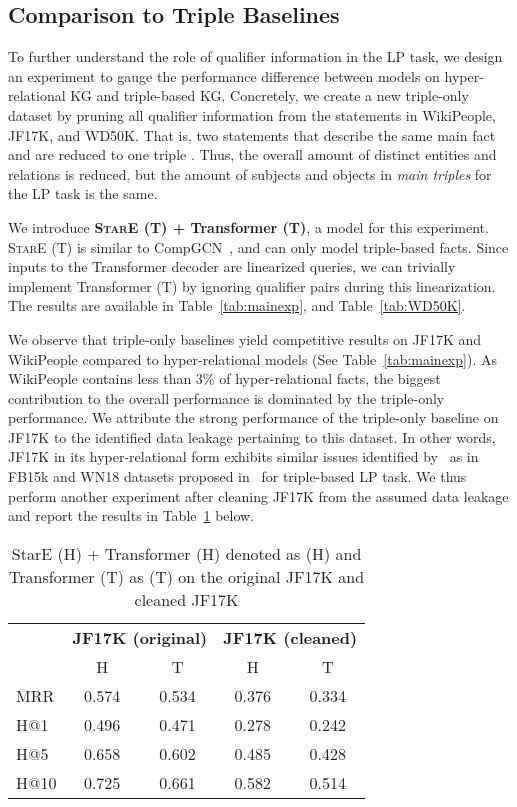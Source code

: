 \documentclass[11pt,a4paper]{article}
\newcommand{\gm}[1]{\textcolor{red}{#1}}
\begin{document}
\subsection{Comparison to Triple Baselines}
\label{exp:triples}

To further understand the role of qualifier information in the LP task, we design an experiment to gauge the performance difference between models on hyper-relational KG and triple-based KG. Concretely, we create a new triple-only dataset by pruning all qualifier information from the statements in WikiPeople, JF17K, and WD50K.
That is, two statements that describe the same main fact  and  are reduced to one triple .
Thus, the overall amount of distinct entities and relations is reduced\gm{,} but the amount of subjects and objects in \emph{main triples} for the LP task is the same.


We introduce \textbf{\textsc{StarE} (T) + Transformer (T)}, a model for this experiment.
\textsc{StarE} (T) is similar to CompGCN~\citep{Vashishth2020Composition-based}, and can only model triple-based  facts.
Since inputs to the Transformer decoder are linearized queries, we can trivially implement Transformer (T) by ignoring qualifier pairs during this linearization. 
The results are available in Table~\ref{tab:mainexp}, and Table~\ref{tab:WD50K}.


We observe that triple-only baselines yield competitive results on JF17K and WikiPeople compared to hyper-relational models (See Table~\ref{tab:mainexp}). 
As WikiPeople contains less than 3\% of hyper-relational facts, the biggest contribution to the overall performance is dominated by the triple-only performance.
We attribute the strong performance of the triple-only baseline on JF17K to the identified data leakage pertaining to this dataset. 
In other words, JF17K in its hyper-relational form exhibits similar issues identified by~\citep{DBLP:journals/corr/abs-2003-08001} as in FB15k and WN18 datasets proposed in~\citep{DBLP:conf/nips/BordesUGWY13} for triple-based LP task.
We thus perform another experiment after cleaning JF17K from the assumed data leakage and report the results in Table~\ref{tab:jf17k_clean} below.

\begin{table}[!h]
\centering
\caption{StarE (H) + Transformer (H) denoted as (H) and Transformer (T) as (T) on the original JF17K and cleaned JF17K}
\label{tab:jf17k_clean}
\begin{tabular}{@{}lcccc@{}}
\toprule
\multirow{2}{*}{} & \multicolumn{2}{c}{\textbf{JF17K (original)}} & \multicolumn{2}{c}{\textbf{JF17K (cleaned)}} \\ \cmidrule(l){2-3} \cmidrule(l){4-5}
 & H & T & H & T \\ \midrule
MRR & 0.574 & 0.534 & 0.376 & 0.334 \\
H@1 & 0.496 & 0.471 & 0.278 & 0.242 \\
H@5 & 0.658 & 0.602 &  0.485 & 0.428 \\
H@10 & 0.725 & 0.661 &  0.582  &  0.514 \\ \bottomrule
\end{tabular}
\end{table}
\end{document}
